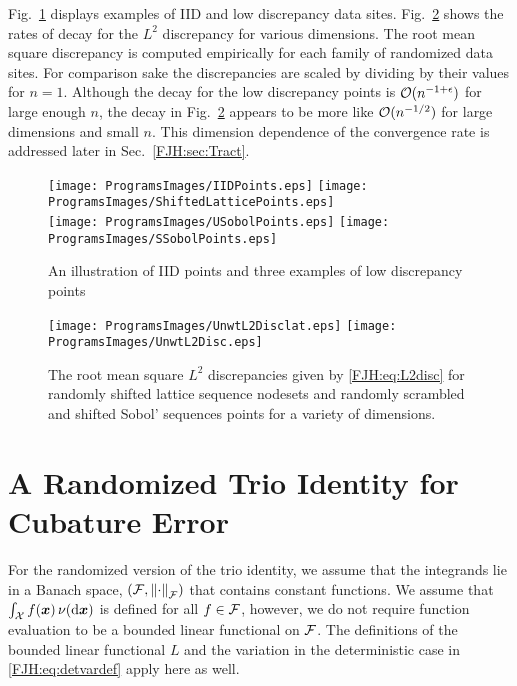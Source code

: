\documentclass[graybox,footinfo]{svmult}
\begin{document}
Fig.\ \ref{FJH:fig:plotsdiffpts} displays examples of IID and low discrepancy data sites.  
Fig.\ \ref{FJH:fig:unwtdiscdiffpts} shows the rates of decay for the $L^2$ discrepancy for 
various dimensions.  The root mean square discrepancy is computed 
empirically for each family of randomized data sites.    For comparison sake the 
discrepancies are scaled by 
dividing by their values for $n=1$.  Although the 
decay for the low discrepancy points is 
${\mathcal{O}}(n^{-1+\epsilon})$ for large enough $n$, the decay in Fig.\ 
\ref{FJH:fig:unwtdiscdiffpts} appears to be 
more like ${\mathcal{O}}(n^{-1/2})$ for large dimensions and small $n$.   This dimension 
dependence of the convergence rate is addressed later in Sec.\  \ref{FJH:sec:Tract}. 


\begin{FJHLesson}
	\FJHLessonTwo
\end{FJHLesson}


\begin{figure}
	\centering
	\texttt{[image: ProgramsImages/IIDPoints.eps]} \qquad
	\texttt{[image: ProgramsImages/ShiftedLatticePoints.eps]} \\
	\texttt{[image: ProgramsImages/USobolPoints.eps]} \qquad
	\texttt{[image: ProgramsImages/SSobolPoints.eps]}
	\caption{An illustration of IID points and three examples of low discrepancy points 
	\label{FJH:fig:plotsdiffpts}}
\end{figure}

\begin{figure}
	\centering
	  \texttt{[image: ProgramsImages/UnwtL2Disclat.eps]}   
	  \qquad 
	  \texttt{[image: ProgramsImages/UnwtL2Disc.eps]} 
	\caption{The root mean square $L^2$ discrepancies given by \eqref{FJH:eq:L2disc} 
	for randomly shifted 
	lattice sequence nodesets and randomly scrambled and shifted Sobol' sequences 
	points for a variety of dimensions.
		\label{FJH:fig:unwtdiscdiffpts}}
\end{figure}

\section{A Randomized Trio Identity for Cubature Error} \label{FJH:sec:rndtrio}
For the randomized version of the trio identity, we assume that the integrands lie in 
a Banach space, $({\mathcal{F}},\left \lVert \cdot \right \rVert_{{\mathcal{F}}})$ that contains 
constant functions.  We assume
that $\int_{{\mathcal{X}}} f({\boldsymbol{x}}) \, \nu(\mathrm{d}{\boldsymbol{x}})$ is defined  for all $f \in {\mathcal{F}}$, however, we  
do not require 
function evaluation to be a bounded linear functional on ${\mathcal{F}}$.  The definitions of the 
bounded linear functional $L$ and the variation in the deterministic case in  
\eqref{FJH:eq:detvardef} apply here as well.
\end{document}
